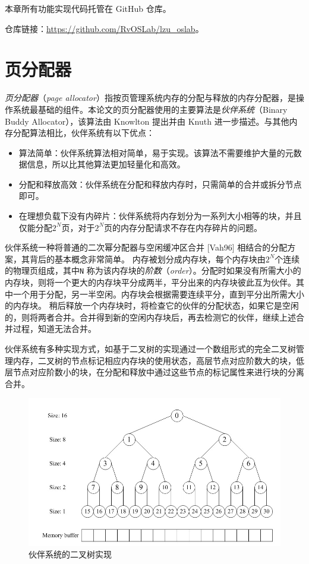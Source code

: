 \documentclass[AutoFakeBold]{LZUThesis}
\begin{document}
\begin{sloppypar}
本章所有功能实现代码托管在 GitHub 仓库。

仓库链接：\href{https://github.com/RvOSLab/lzu_oslab}{https://github.com/RvOSLab/lzu\_oslab}。

\chapter{页分配器}

\emph{页分配器}（\emph{page
allocator}）指按页管理系统内存的分配与释放的内存分配器，是操作系统最基础的组件。本论文的页分配器使用的主要算法是\emph{伙伴系统}（Binary
Buddy Allocator），该算法由 Knowlton{\cite{knowlton1965fast}} 提出并由 Knuth
{\cite{knuth1968art}} 进一步描述。与其他内存分配算法相比，伙伴系统有以下优点：

\begin{itemize}
\item
  算法简单：伙伴系统算法相对简单，易于实现。该算法不需要维护大量的元数据信息，所以比其他算法更加轻量化和高效。
\item
  分配和释放高效：伙伴系统在分配和释放内存时，只需简单的合并或拆分节点即可。
\item
  在理想负载下没有内碎片：伙伴系统将内存划分为一系列大小相等的块，并且仅能分配\(2^N\)页，对于\(2^N\)页的内存分配请求不存在内存碎片的问题。
\end{itemize}

伙伴系统一种将普通的二次幂分配器与空闲缓冲区合并 {[}Vah96{]}
相结合的分配方案，其背后的基本概念非常简单。
内存被划分成内存块，每个内存块由\(2^N\)个连续的物理页组成，其中\texttt{N}
称为该内存块的\emph{阶数}（\emph{order}）。分配时如果没有所需大小的内存块，则将一个更大的内存块平分成两半，平分出来的内存块彼此互为伙伴。其中一个用于分配，另一半空闲。内存块会根据需要连续平分，直到平分出所需大小的内存块。
稍后释放一个内存块时，将检查它的伙伴的分配状态，如果它是空闲的，则将两者合并。合并得到新的空闲内存块后，再去检测它的伙伴，继续上述合并过程，知道无法合并。

伙伴系统有多种实现方式，如基于二叉树的实现通过一个数组形式的完全二叉树管理内存，二叉树的节点标记相应内存块的使用状态，高层节点对应阶数大的块，低层节点对应阶数小的块，在分配和释放中通过这些节点的标记属性来进行块的分离合并。

\begin{figure}
\centering
\includegraphics[width=400pt]{images/buddy-system-binary-tree-implementation.jpg}
\caption{伙伴系统的二叉树实现}
\end{figure}



\end{sloppypar}
\end{document}

